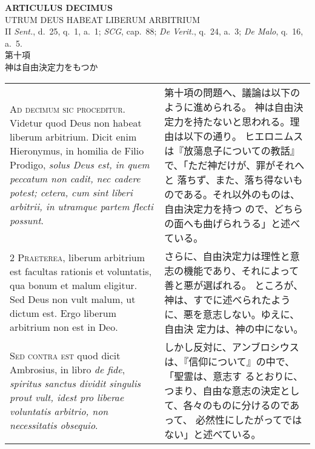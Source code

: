 \documentclass[10pt]{jsarticle} %
\begin{document}
\begin{center}
 {\Large {\bf ARTICULUS DECIMUS}}\\
 {\large UTRUM DEUS HABEAT LIBERUM ARBITRIUM}\\
 {\footnotesize II {\itshape Sent.}, d.~25, q.~1, a.~1; {\itshape SCG},
 cap.~88; {\itshape De Verit.}, q.~24, a.~3; {\itshape De Malo}, q.~16, a.~5.}\\
 {\Large 第十項\\神は自由決定力をもつか}
\end{center}

\begin{longtable}{p{21em}p{21em}}
{\huge A}{\scshape d decimum sic proceditur}. Videtur quod
Deus non habeat liberum arbitrium. Dicit enim Hieronymus, in homilia de
Filio Prodigo, {\itshape solus Deus est, in quem peccatum non cadit, nec cadere
potest; cetera, cum sint liberi arbitrii, in utramque partem flecti
possunt}.

&

第十項の問題へ、議論は以下のように進められる。
神は自由決定力を持たないと思われる。理由は以下の通り。
ヒエロニムスは『放蕩息子についての教話』で、「ただ神だけが、罪がそれへと
 落ちず、また、落ち得ないものである。それ以外のものは、自由決定力を持つ
 ので、どちらの面へも曲げられうる」と述べている。

\\


{\scshape 2 Praeterea}, liberum arbitrium est facultas
rationis et voluntatis, qua bonum et malum eligitur. Sed Deus non vult
malum, ut dictum est. Ergo liberum arbitrium non est in Deo.


&

さらに、自由決定力は理性と意志の機能であり、それによって善と悪が選ばれる。
 ところが、神は、すでに述べられたように、悪を意志しない。ゆえに、自由決
 定力は、神の中にない。

\\


{\scshape Sed contra est} quod dicit Ambrosius, in
libro {\itshape de fide}, {\itshape spiritus sanctus dividit singulis prout vult, idest pro
liberae voluntatis arbitrio, non necessitatis obsequio}.


&


しかし反対に、アンブロシウスは、『信仰について』の中で、「聖霊は、意志す
 るとおりに、つまり、自由な意志の決定として、各々のものに分けるのであって、
 必然性にしたがってではない」と述べている。

\\



\end{longtable}
\end{document}
